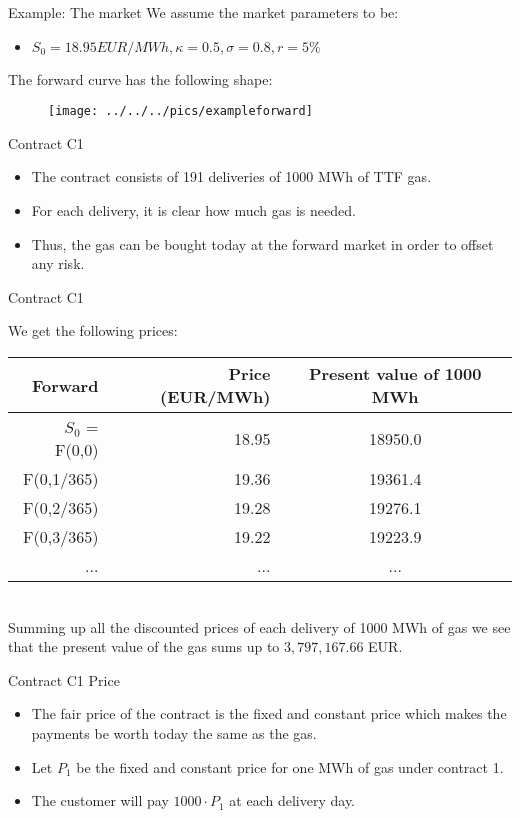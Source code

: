 {Example: The market}
We assume the market parameters to be:
\begin{itemize}
\item $S_0 = 18.95 EUR/MWh, \kappa = 0.5, \sigma = 0.8, r= 5\%$
\end{itemize}
The forward curve has the following shape:
\begin{figure}
	\centering
		\texttt{[image: ../../../pics/exampleforward]}
	\label{fig:exampleforward}
\end{figure}

{Contract C1}
\begin{itemize}
\item<1-> The contract consists of 191 deliveries of 1000 MWh of TTF gas.
\item<2-> For each delivery, it is clear how much gas is needed.
\item<3-> Thus, the gas can be bought today at the forward market in order to offset any risk.
\end{itemize}

{Contract C1}

We get the following prices:
\begin{tabular}{rrc}
   Forward &      Price (EUR/MWh)& Present value of 1000 MWh \\
\hline
$S_0$ = F(0,0) &         18.95 &      18950.0 \\

 F(0,1/365) &    19.36 &    19361.4 \\

 F(0,2/365) &    19.28 &    19276.1 \\

 F(0,3/365) &    19.22 &    19223.9 \\
...&...&...\\
\end{tabular}  \\
Summing up all the discounted prices of each delivery of 1000 MWh of gas we see that the present value of the gas sums up to $3,797,167.66$ EUR.

{Contract C1 Price}
\begin{itemize}
\item<1-> The fair price of the contract is the fixed and constant price which makes the payments be worth today the same as the gas.
\item<2-> Let $P_1$ be the fixed and constant price for one MWh of gas under contract 1.
\item<3-> The customer will pay $1000 \cdot P_1$ at each delivery day.
\end{itemize}

